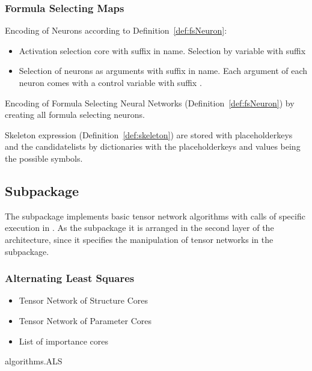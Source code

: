 \subsubsection{Formula Selecting Maps}

Encoding of Neurons according to Definition~\ref{def:fsNeuron}:
\begin{itemize}
	\item Activation selection core with suffix  in name.
		 Selection by variable with suffix 
	\item Selection of neurons as arguments with suffix  in name.
		Each argument of each neuron comes with a control variable with suffix .
\end{itemize}

Encoding of Formula Selecting Neural Networks (Definition~\ref{def:fsNeuron}) by creating all formula selecting neurons.

Skeleton expression (Definition~\ref{def:skeleton}) are stored with placeholderkeys and the candidatelists by dictionaries with the placeholderkeys and values being the possible symbols.



\subsection{Subpackage \spalgorithms}

The \spalgorithms subpackage implements basic tensor network algorithms with calls of specific execution in \spengine.
As the \spencoding subpackage it is arranged in the second layer of the \tnreason architecture, since it specifies the manipulation of tensor networks in the \spengine subpackage.


\subsubsection{Alternating Least Squares}

\begin{itemize}
	\item Tensor Network of Structure Cores
	\item Tensor Network of Parameter Cores
	\item List of importance cores
\end{itemize}

\begin{centeredcode}
	algorithms.ALS
\end{centeredcode}

